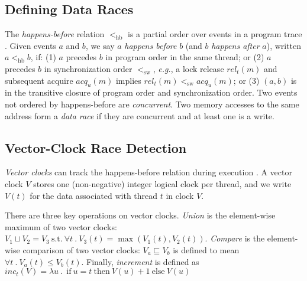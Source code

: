 \documentclass[preprint, 10pt]{sigplanconf}
\newcommand{\eg}{\textit{e.g.}\xspace}
\newcommand{\hb}[0]{<_{\mathrm{hb}}}
\newcommand{\sw}[0]{<_{\mathrm{sw}}}
\newcommand{\Tid}{t}
\newcommand{\TidU}{u}
\newcommand{\Lock}{m}
\newcommand{\AcqOp}[2]{acq_{#1}(#2)}
\newcommand{\RelOp}[2]{rel_{#1}(#2)}
\newcommand{\VC}{V}
\newcommand{\SuchThat}{\ \text{s.t.}\ }
\newcommand{\Bind}{\ .\ }
\newcommand{\VCMax}{\sqcup}
\newcommand{\VCCompare}{\sqsubseteq}
\begin{document}
\subsection{Defining Data Races}

The \emph{happens-before} relation $\hb$ is a partial order over events in a
program trace \cite{lamport-hb}.  Given events $a$ and $b$, we say $a$
\emph{happens before} $b$ (and $b$ \emph{happens after} $a$), written $a \hb b$,
if: (1) $a$ precedes $b$ in program order in the same thread; or (2) $a$
precedes $b$ in synchronization order $\sw$, \eg, a lock release $\RelOp{\Tid}{\Lock}$
and subsequent acquire $\AcqOp{\TidU}{\Lock}$ implies $\RelOp{\Tid}{\Lock} \sw \AcqOp{\TidU}{\Lock}$; or (3) $(a,b)$ is in the
transitive closure of program order and synchronization order.
Two events not ordered by happens-before are \emph{concurrent}.  Two
memory accesses to the same address form a \emph{data race} if they are
concurrent and at least one is a write.

\subsection{Vector-Clock Race Detection}
\label{vector-clocks}

\emph{Vector clocks} can track the happens-before relation during
execution \cite{fidge-vc,mattern-vc}.  A vector clock $\VC$ stores one (non-negative) integer
logical clock per thread, and we write $\VC(\Tid)$ for the data associated with thread $\Tid$ in clock $\VC$.

  There are three key operations on vector clocks.
\emph{Union} is the element-wise maximum of two vector clocks:
$\VC_1 \VCMax \VC_2 = \VC_3 \SuchThat \forall \Tid \Bind \VC_3(\Tid) =
\max(\VC_1(\Tid), \VC_2(\Tid))$. \emph{Compare} is the element-wise
comparison of two vector clocks: $\VC_a \VCCompare \VC_b$ is defined to mean $\forall
\Tid \Bind \VC_a(\Tid) \leq \VC_b(\Tid)$.  Finally, \emph{increment} is defined as $inc_t(V) = \lambda u \Bind \mathrm{~if~} u=t \mathrm{~then~} V(u)+1 \mathrm{~else~} V(u)$
\end{document}
